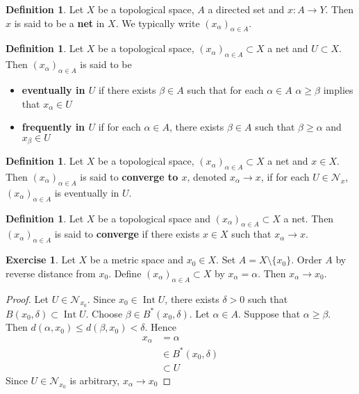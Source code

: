 \documentclass[12pt]{amsart}
\theoremstyle{definition}
\newtheorem{defn}[definition]{Definition}
\newtheorem{ex}[definition]{Exercise}
\newcommand{\al}{\alpha}
\newcommand{\be}{\beta}
\newcommand{\del}{\delta}
\newcommand{\MN}{\mathcal{N}}
\newcommand{\tbf}[1]{\textbf{#1}}
\DeclareMathOperator{\Int}{Int}
\DeclareMathOperator*{\0}{\mbf{0}}
\DeclareMathOperator*{\1}{\mbf{1}}
\newcommand{\ld}[1]{\label{defn:#1}}
\begin{document}
	\begin{defn} \ld{33004}
	Let $X$ be a topological space, $A$ a directed set and $x:A \rightarrow Y$. Then $x$ is said to be a \tbf{net} in $X$. We typically write $(x_{\al})_{\al \in A}$. 
	\end{defn}
	
	\begin{defn} \ld{33005}
	Let $X$ be a topological space, $(x_{\al})_{\al \in A} \subset X$ a net and $U \subset X$.
	Then $(x_{\al})_{\al \in A}$ is said to be 
	\begin{itemize}
	\item \tbf{eventually in $U$} if there exists $\be \in A$ such that for each $\al \in A$ $\al \geq \be$ implies that $x_{\al} \in U$
	\item \tbf{frequently in $U$}  if for each $\al \in A$, there exists $\be \in A$ such that $\be \geq \al $ and $x_{\be} \in U$
	\end{itemize}
	\end{defn}
	
	\begin{defn} \ld{33006}
	Let $X$ be a topological space, $(x_{\al})_{\al \in A} \subset X$ a net and $x \in X$. Then $(x_{\al})_{\al \in A}$ is said to \tbf{converge to $x$}, denoted $x_{\al} \rightarrow x$, if for each $U \in \MN_x$, $(x_{\al})_{\al \in A}$ is eventually in $U$. 
	\end{defn}	
	
	\begin{defn} \ld{33007}
	Let $X$ be a topological space and $(x_{\al})_{\al \in A} \subset X$ a net. Then $(x_{\al})_{\al \in A}$ is said to \tbf{converge} if there exists $x \in X$ such that $x_{\al} \rightarrow x$. 
	\end{defn}	

	\begin{ex}
		Let $X$ be a metric space and $x_0 \in X$. Set $A = X \setminus \{x_0\}$. Order $A$ by reverse distance from $x_0$. Define $(x_{\al})_{\al \in A} \subset X$ by $x_{\al} = \al$. Then $x_{\al} \rightarrow x_0$.
	\end{ex}

	\begin{proof}
		Let $U \in \MN_{x_0}$. Since $x_0 \in \Int U$, there exists $\del > 0$ such that $B(x_0, \del) \subset \Int U$. Choose $\be \in B^*(x_0, \del)$. Let $\al \in A$. Suppose that $\al \geq \be$. Then $d(\al, x_0) \leq d(\be, x_0) < \del$. Hence  
		\begin{align*}
			x_{\al} 
			&= \al  \\
			& \in B^*(x_0, \del) \\
			&\subset U
		\end{align*}
		Since $U \in \MN_{x_0}$ is arbitrary, $x_{\al} \rightarrow x_0 $
	\end{proof}
	
\end{document}
